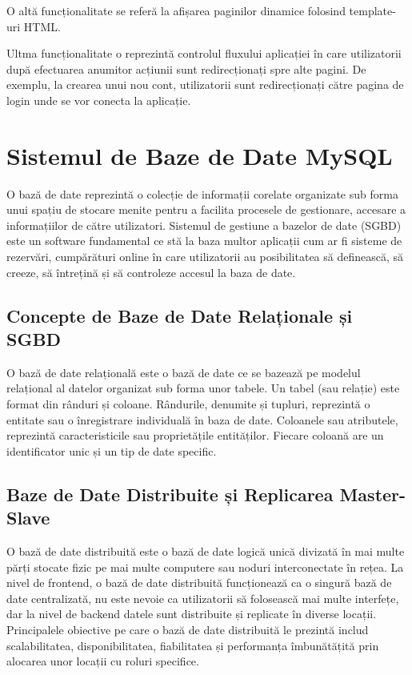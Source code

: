 \documentclass[12pt, a4paper, oneside, romanian]{teza-upb}
\begin{document}
	O altă funcționalitate se referă la afișarea paginilor dinamice folosind template-uri HTML.
	
	Ultma funcționalitate o reprezintă controlul fluxului aplicației în care utilizatorii după efectuarea anumitor acțiunii sunt redirecționați spre alte pagini. De exemplu, la crearea unui nou cont, utilizatorii sunt redirecționați către pagina de login unde se vor conecta la aplicație.
	
	\section{Sistemul de Baze de Date MySQL}
	
	
	O bază de date reprezintă \cite{bdd} o colecție de informații corelate organizate sub forma unui spațiu de stocare menite pentru a facilita procesele de gestionare, accesare a informațiilor de către utilizatori. Sistemul de gestiune a bazelor de date (SGBD) este un software fundamental ce stă la baza multor aplicații cum ar fi sisteme de rezervări, cumpărături online în care utilizatorii au posibilitatea să definească, să creeze, să întrețină și să controleze accesul la baza de date. 
	
	\subsection{Concepte de Baze de Date Relaționale și SGBD}
	O bază de date relațională este o bază de date ce se bazează pe modelul relațional al datelor organizat sub forma unor tabele. Un tabel (sau relație) este format din rânduri și coloane. Rândurile, denumite și tupluri, reprezintă o entitate sau o înregistrare individuală în baza de date. Coloanele sau atributele, reprezintă caracteristicile sau proprietățile entităților. Fiecare coloană are un identificator unic și un tip de date specific.
	
	\subsection{Baze de Date Distribuite și Replicarea Master-Slave}
	
	O bază de date distribuită este o bază de date logică unică divizată în mai multe părți stocate fizic pe mai multe computere sau noduri interconectate în rețea. La nivel de frontend, o bază de date distribuită funcționează ca o singură bază de date centralizată, nu este nevoie ca utilizatorii să folosească mai multe interfețe, dar la nivel de backend datele sunt distribuite și replicate în diverse locații. Principalele obiective pe care o bază de date distribuită le prezintă includ scalabilitatea, disponibilitatea, fiabilitatea și performanța îmbunătățită prin alocarea unor locații cu roluri specifice.
	
\end{document}

